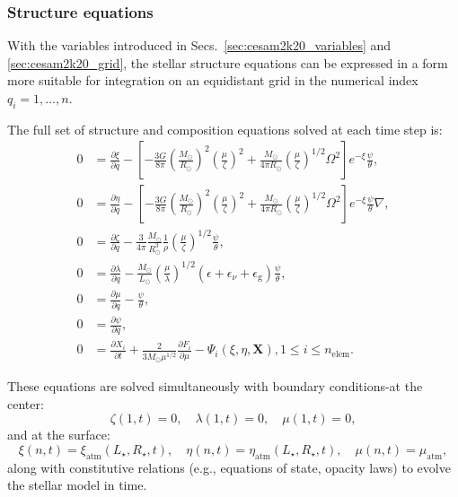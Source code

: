\documentclass[12pt,a4paper]{article}
\newcommand{\mr}{\mathrm}
\newcommand{\pfird}[2][]{\frac{\partial#1}{\partial#2}}
\newcommand{\bvec}[1]{\boldsymbol{#1}}
\begin{document}
\subsubsection{Structure equations}
\label{sec:cesam2k20_struct_eq}

With the variables introduced in Secs.~\ref{sec:cesam2k20_variables} and \ref{sec:cesam2k20_grid}, the stellar structure equations can be expressed in a form more suitable for integration on an equidistant grid in the numerical index $q_i = 1, \ldots, n$. 

The full set of structure and composition equations solved at each time step is:
\begin{subequations} \label{eq:cesam2k20_struct_eq}
  \begin{align}
    0 &= \pfird[\xi]{q} - \left[-\frac{3G}{8\pi}\left(\frac{M_\odot}{R_\odot}\right)^2\left(\frac{\mu}{\zeta}\right)^2 + \frac{M_\odot}{4\pi R_\odot}\left(\frac{\mu}{\zeta}\right)^{1/2} \Omega^2\right]e^{-\xi}\frac{\psi}{\theta},\\
    0 &= \pfird[\eta]{q} - \left[-\frac{3G}{8\pi}\left(\frac{M_\odot}{R_\odot}\right)^2\left(\frac{\mu}{\zeta}\right)^2 + \frac{M_\odot}{4\pi R_\odot}\left(\frac{\mu}{\zeta}\right)^{1/2} \Omega^2\right]e^{-\xi}\frac{\psi}{\theta}\nabla,\\
    0 &= \pfird[\zeta]{q} - \frac{3}{4\pi}\frac{M_\odot}{R_\odot^3}\frac{1}{\rho}\left(\frac{\mu}{\zeta}\right)^{1/2}\frac{\psi}{\theta},\\
    0 &= \pfird[\lambda]{q} - \frac{M_\odot}{L_\odot}\left(\frac{\mu}{\lambda}\right)^{1/2}(\epsilon  + \epsilon_\nu + \epsilon_\mr{g})\frac{\psi}{\theta},\\
    0 &= \pfird[\mu]{q} - \frac{\psi}{\theta},\\
    0 &= \pfird[\psi]{q},\\
    0 &= \pfird[X_i]{t} + \frac{2}{3 M_\odot\mu^{1/2}}\pfird[F_i]{\mu} - \Psi_i(\xi, \eta, \bvec{X}), 1\leq i \leq n_\mr{elem}.
  \end{align}
\end{subequations}

These equations are solved simultaneously with boundary conditions-at the center:
\begin{equation}
  \zeta(1, t) = 0,\quad \lambda(1, t) =0, \quad \mu(1, t) = 0,
\end{equation}
and at the surface:
\begin{equation}
  \xi(n, t) = \xi_\mr{atm}(L_\star, R_\star, t),\quad \eta(n, t) = \eta_\mr{atm}(L_\star, R_\star, t),\quad \mu(n, t) = \mu_\mr{atm},
\end{equation}
along with constitutive relations (e.g., equations of state, opacity laws) to evolve the stellar model in time.
\end{document}
